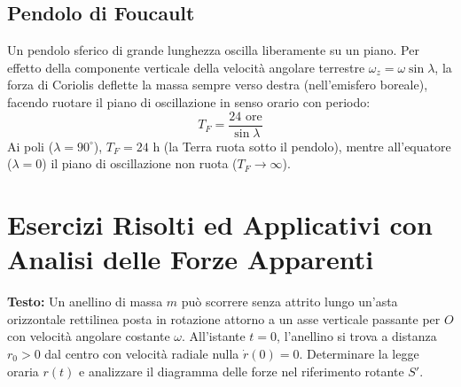 \subsection{Pendolo di Foucault}
Un pendolo sferico di grande lunghezza oscilla liberamente su un piano. Per effetto della componente verticale della velocità angolare terrestre $\omega_z = \omega\sin\lambda$, la forza di Coriolis deflette la massa sempre verso destra (nell'emisfero boreale), facendo ruotare il piano di oscillazione in senso orario con periodo:
\begin{equation}
    T_F = \frac{24\text{ ore}}{\sin\lambda}
\end{equation}
Ai poli ($\lambda = 90^\circ$), $T_F = 24\text{ h}$ (la Terra ruota sotto il pendolo), mentre all'equatore ($\lambda = 0$) il piano di oscillazione non ruota ($T_F \to \infty$).

\section{Esercizi Risolti ed Applicativi con Analisi delle Forze Apparenti}
\label{sec:esercizi_non_inerziali}

\begin{esercizio}
\textbf{Testo:}
Un anellino di massa $m$ può scorrere senza attrito lungo un'asta orizzontale rettilinea posta in rotazione attorno a un asse verticale passante per $O$ con velocità angolare costante $\omega$. All'istante $t=0$, l'anellino si trova a distanza $r_0 > 0$ dal centro con velocità radiale nulla $\dot{r}(0) = 0$. Determinare la legge oraria $r(t)$ e analizzare il diagramma delle forze nel riferimento rotante $S'$.
\end{esercizio}

